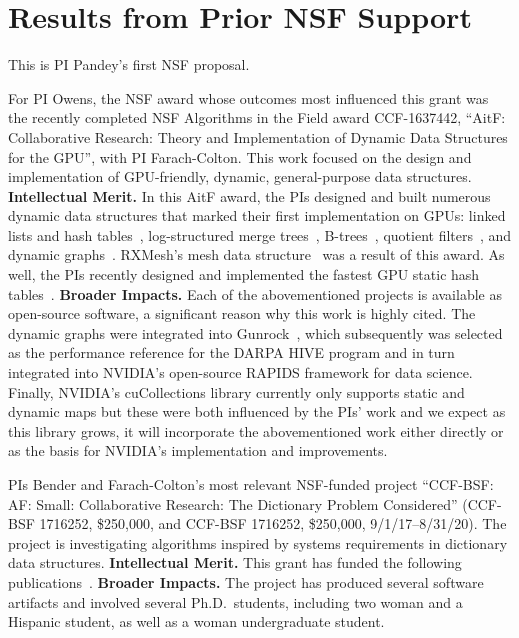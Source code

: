 \section{Results from Prior NSF Support}

This is PI Pandey's first NSF proposal.

For PI Owens, the NSF award whose outcomes most influenced this grant was the recently completed NSF Algorithms in the Field award CCF-1637442, ``AitF\@: Collaborative Research: Theory and Implementation of Dynamic Data Structures for the GPU'', with PI Farach-Colton. This work focused on the design and implementation of GPU-friendly, dynamic, general-purpose data structures.
\textbf{Intellectual Merit.} In this AitF award, the PIs designed and built numerous dynamic data structures that marked their first implementation on GPUs: linked lists and hash tables~\cite{Ashkiani:2018:ADH}, log-structured merge trees~\cite{Ashkiani:2018:GLA}, B-trees~\cite{Awad:2019:EAH}, quotient filters~\cite{Geil:2018:QFA}, and dynamic graphs~\cite{Awad:2020:DGO}. RXMesh's mesh data structure~\cite{Mahmoud:2021:RAG} was a result of this award. As well, the PIs recently designed and implemented the fastest GPU static hash tables~\cite{Awad:2023:AAI}.
%
\textbf{Broader Impacts.} Each of the abovementioned projects is available as open-source software, a significant reason why this work is highly cited. The dynamic graphs were integrated into Gunrock~\cite{Awad:2020:DGO,Wang:2017:GGG}, which subsequently was selected as the performance reference for the DARPA HIVE program and in turn integrated into NVIDIA's open-source RAPIDS framework for data science. Finally, NVIDIA's cuCollections library currently only supports static and dynamic maps but these were both influenced by the PIs' work and we expect as this library grows, it will incorporate the abovementioned work either directly or as the basis for NVIDIA's implementation and improvements.

PIs Bender and Farach-Colton's most relevant NSF-funded project ``CCF-BSF\@: AF\@: Small: Collaborative Research: The Dictionary Problem Considered''
(CCF-BSF 1716252, \$250,000, and CCF-BSF 1716252, \$250,000, 9/1/17--8/31/20).
The project is investigating algorithms inspired by systems requirements in dictionary data structures.
\textbf{Intellectual Merit.} This grant has funded the following
publications~\cite{AgrawalBeDa20,AgrawalBeFi20,%
ArkinDaGa20,Ashkiani:2018:ADH,Ashkiani:2018:GLA,BenderChDa20,BenderCoFa19,BenderDaJo20,BenderFaGo18,%
BenderFaKu19,BenderGoMe20,BenderKoKu20,ChenMcSi18,ConwayBaJi17b,ConwayFaSh18,ConwayKnJi19,%
DasAgBe20,DasTsDu19,BerceaEv20a,BerceaEv20b,%
ZhanCoJi18,ZhanJaPo18,Mayer18,Pandey19,PandeyABFJP18Cell,PandeyBJP17,%
PandeyBJP17a,PandeyBJP17b,Singh18,SinghMaBe20,%
JavanmardGaDa19DISC,%
GoswamiMeMe18,%
Geil:2018:QFA,pandey2020timely,%
EvenMeRa18,Awad:2019:EAH,BenderFiGi19,Farach-ColtonLiTs18,BenderKoPe18}.
%
\textbf{Broader Impacts.} The project has produced several software artifacts and involved several Ph.D.\ students, including two woman and a Hispanic student, as well as a woman undergraduate student.
